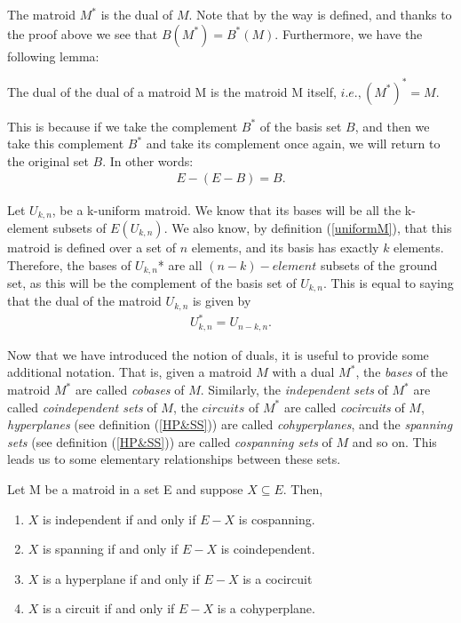 The matroid $M^*$ is the dual of $M$. Note that by the way is defined, and thanks to the proof above we see that $B(M^*)=B^*(M)$. Furthermore, we have the following lemma:

\begin{lemma}
    The dual of the dual of a matroid M is the matroid M itself, $i.e., (M^*)^* = M$.
\end{lemma}

This is because if we take the complement $B^*$ of the basis set $B$, and then we take this complement $B^*$ and take its complement once again, we will return to the original set $B$. In other words:
\begin{align*}
E-(E - B) = B.
\end{align*}

\begin{exmp}
    Let $U_{k,n}$, be a k-uniform matroid. We know that its bases will be all the k-element subsets of $E(U_{k,n})$. We also know, by definition (\ref{uniformM}), that this matroid is defined over a set of $n$ elements, and its basis has exactly $k$ elements. Therefore, the bases of $U_{k,n}$* are all $(n-k)-element$ subsets of the ground set, as this will be the complement of the basis set of $U_{k,n}$. This is equal to saying that the dual of the matroid $U_{k,n}$ is given by 
    \begin{align*}
    U_{k,n} ^*  = U_{n-k,n}.
    \end{align*}
\end{exmp}

Now that we have introduced the notion of duals, it is useful to provide some additional notation. That is, given a matroid $M$ with a dual $M^*$, the \textit{bases} of the matroid $M^*$ are called \textit{cobases} of $M$. Similarly, the \textit{independent sets} of $M^*$ are called \textit{coindependent sets} of $M$, the $circuits$ of $M^*$ are called \textit{cocircuits} of $M$, \textit{hyperplanes} (see definition (\ref{HP&SS})) are called \textit{cohyperplanes}, and the \textit{spanning sets} (see definition (\ref{HP&SS})) are called \textit{cospanning sets} of $M$ and so on. This leads us to some elementary relationships between these sets. 

\begin{theorem}\label{propositionsofdualrelations}
    Let M be a matroid in a set E and suppose $X \subseteq E$. Then,
    \begin{enumerate}
        \item $X$ is independent if and only if $E-X$ is cospanning.
        \item $X$ is spanning if and only if $E-X$ is coindependent.
        \item $X$ is a hyperplane if and only if $E-X$ is a cocircuit
        \item $X$ is a circuit if and only if $E-X$ is a cohyperplane.
    \end{enumerate}
\end{theorem} 

